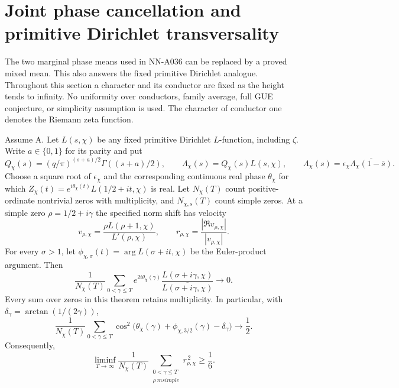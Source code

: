 \section{Joint phase cancellation and primitive Dirichlet transversality}

The two marginal phase means used in NN-A036 can be replaced by a
proved mixed mean. This also answers the fixed primitive Dirichlet
analogue. Throughout this section a character and its conductor are
fixed as the height tends to infinity. No uniformity over conductors,
family average, full GUE conjecture, or simplicity assumption is used.
The character of conductor one denotes the Riemann zeta function.

\begin{theorem}
Assume A. Let $L(s,\chi)$ be any fixed primitive Dirichlet $L$-function,
including $\zeta$. Write $a\in\{0,1\}$ for its parity and put
\[
 Q_\chi(s)=(q/\pi)^{(s+a)/2}\Gamma((s+a)/2),\qquad
 \Lambda_\chi(s)=Q_\chi(s)L(s,\chi),\qquad
 \Lambda_\chi(s)=\epsilon_\chi\overline{\Lambda_\chi(1-\bar s)}.
\]
Choose a square root of $\epsilon_\chi$ and the corresponding continuous
real phase $\theta_\chi$ for which
$Z_\chi(t)=e^{i\theta_\chi(t)}L(1/2+it,\chi)$ is real. Let
$N_\chi(T)$ count positive-ordinate nontrivial zeros with multiplicity,
and $N_{\chi,s}(T)$ count simple zeros. At a simple zero $\rho=1/2+i\gamma$
the specified norm shift has velocity
\[
 v_{\rho,\chi}=
 \frac{\rho L(\rho+1,\chi)}{L'(\rho,\chi)},\qquad
 r_{\rho,\chi}=\frac{|\Re v_{\rho,\chi}|}{|v_{\rho,\chi}|}.
\]
For every $\sigma>1$, let
$\phi_{\chi,\sigma}(t)=\arg L(\sigma+it,\chi)$ be the Euler-product
argument. Then
\begin{equation}\label{eq:A037-joint}
 \frac1{N_\chi(T)}\sum_{0<\gamma\le T}
 e^{2i\theta_\chi(\gamma)}
 \frac{L(\sigma+i\gamma,\chi)}
      {\overline{L(\sigma+i\gamma,\chi)}}\longrightarrow0.
\end{equation}
Every sum over zeros in this theorem retains multiplicity. In particular,
with $\delta_\gamma=\arctan(1/(2\gamma))$,
\begin{equation}\label{eq:A037-second}
 \frac1{N_\chi(T)}\sum_{0<\gamma\le T}
 \cos^2\bigl(\theta_\chi(\gamma)+
              \phi_{\chi,3/2}(\gamma)-\delta_\gamma\bigr)
 \longrightarrow\frac12.
\end{equation}
Consequently,
\[
 \liminf_{T\to\infty}\frac1{N_\chi(T)}
 \sum_{\substack{0<\gamma\le T\\\rho\ {
m simple}}}
 r_{\rho,\chi}^{\,2}\ge\frac16.
\]
\end{theorem}
